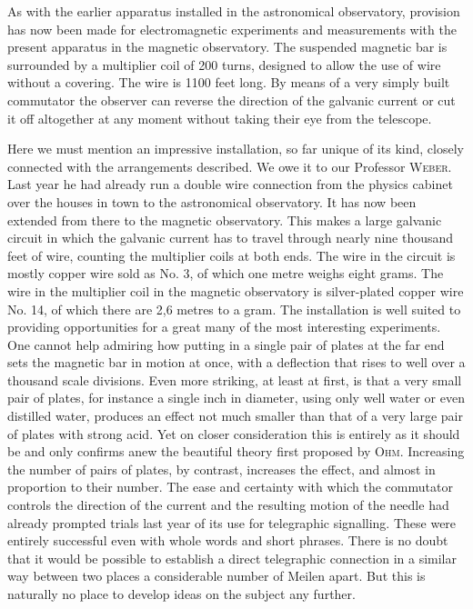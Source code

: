 As with the earlier apparatus installed in the astronomical observatory, provision has now been made for electromagnetic experiments and measurements with the present apparatus in the magnetic observatory. The suspended magnetic bar is surrounded by a multiplier coil of 200 turns, designed to allow the use of wire without a covering. The wire is 1100 feet long. By means of a very simply built commutator the observer can reverse the direction of the galvanic current or cut it off altogether at any moment without taking their eye from the telescope.

Here we must mention an impressive installation, so far unique of its kind, closely connected with the arrangements described. We owe it to our Professor \textsc{Weber}. Last year he had already run a double wire connection from the physics cabinet over the houses in town to the astronomical observatory. It has now been extended from there to the magnetic observatory. This makes a large galvanic circuit in which the galvanic current has to travel through nearly nine thousand feet of wire, counting the multiplier coils at both ends. The wire in the circuit is mostly copper wire sold as No. 3, of which one metre weighs eight grams. The wire in the multiplier coil in the magnetic observatory is silver-plated copper wire No. 14, of which there are 2,6 metres to a gram. The installation is well suited to providing opportunities for a great many of the most interesting experiments. One cannot help admiring how putting in a single pair of plates at the far end
sets the magnetic bar in motion at once, with a deflection that rises to well over a thousand scale divisions. Even more striking, at least at first, is that a very small pair of plates, for instance a single inch in diameter, using only well water or even distilled water, produces an effect not much smaller than that of a very large pair of plates with strong acid. Yet on closer consideration this is entirely as it should be and only confirms anew the beautiful theory first proposed by \textsc{Ohm}. Increasing the number of pairs of plates, by contrast, increases the effect, and almost in proportion to their number. The ease and certainty with which the commutator controls the direction of the current and the resulting motion of the needle had already prompted trials last year of its use for telegraphic signalling. These were entirely successful even with whole words and short phrases. There is no doubt that it would be possible to establish a direct telegraphic connection in a similar way between two places a considerable number of Meilen apart. But this is naturally no place to develop ideas on the subject any further.

\bigskip
